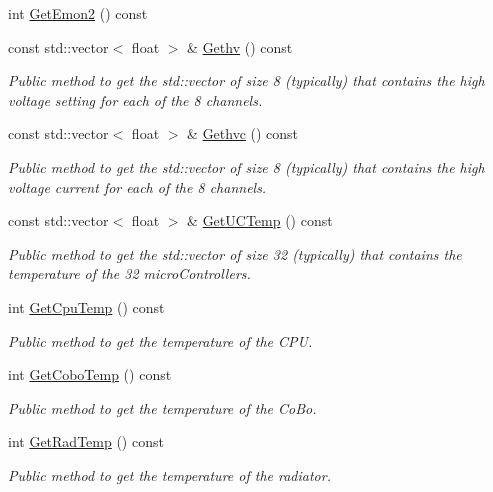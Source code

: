 \begin{DoxyCompactItemize}
int \hyperlink{classIEvent_a7733e88f4e08eee6073a448d6b75723b}{Get\+Emon2} () const
\item 
const std\+::vector$<$ float $>$ \& \hyperlink{classIEvent_aa807a64494e2a7d87c2cf430574a1b0c}{Gethv} () const
\begin{DoxyCompactList}\small\item\em Public method to get the std\+::vector of size 8 (typically) that contains the high voltage setting for each of the 8 channels. \end{DoxyCompactList}\item 
const std\+::vector$<$ float $>$ \& \hyperlink{classIEvent_a8bf0dad45d6a5aef35cbd32e58e79d95}{Gethvc} () const
\begin{DoxyCompactList}\small\item\em Public method to get the std\+::vector of size 8 (typically) that contains the high voltage current for each of the 8 channels. \end{DoxyCompactList}\item 
const std\+::vector$<$ float $>$ \& \hyperlink{classIEvent_a6b3078eccf01ac33208ef2570aa7565b}{Get\+U\+C\+Temp} () const
\begin{DoxyCompactList}\small\item\em Public method to get the std\+::vector of size 32 (typically) that contains the temperature of the 32 micro\+Controllers. \end{DoxyCompactList}\item 
int \hyperlink{classIEvent_a57da66c02aa6bec76d1d04e4993279f4}{Get\+Cpu\+Temp} () const
\begin{DoxyCompactList}\small\item\em Public method to get the temperature of the C\+PU. \end{DoxyCompactList}\item 
int \hyperlink{classIEvent_af871e86c8478223d55e3221c7590e3e7}{Get\+Cobo\+Temp} () const
\begin{DoxyCompactList}\small\item\em Public method to get the temperature of the Co\+Bo. \end{DoxyCompactList}\item 
int \hyperlink{classIEvent_a81f3a4f65606318ac4d5d99ee9e04fbd}{Get\+Rad\+Temp} () const
\begin{DoxyCompactList}\small\item\em Public method to get the temperature of the radiator. \end{DoxyCompactList}\item 

\end{DoxyCompactItemize}
